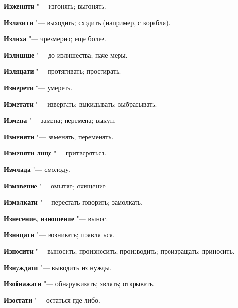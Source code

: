 \begin{mymulticols}{2}
\noindent\textbf{Изженяти} "--- изгонять; выгонять. 




\noindent\textbf{Излазити} "--- выходить; сходить (например, с корабля). 




\noindent\textbf{Излиха} "--- чрезмерно; еще более. 




\noindent\textbf{Излишше} "--- до излишества; паче меры. 




\noindent\textbf{Изляцати} "--- протягивать; простирать. 




\noindent\textbf{Измерети} "--- умереть. 




\noindent\textbf{Изметати} "--- извергать; выкидывать; выбрасывать. 




\noindent\textbf{Измена} "--- замена; перемена; выкуп. 




\noindent\textbf{Изменяти} "--- заменять; переменять. 




\noindent\textbf{Изменяти лице} "--- притворяться. 




\noindent\textbf{Измлада} "--- смолоду. 




\noindent\textbf{Измовение} "--- омытие; очищение. 




\noindent\textbf{Измолкати} "--- перестать говорить; замолкать. 




\noindent\textbf{Изнесение, изношение} "--- вынос. 




\noindent\textbf{Изницати} "--- возникать; появляться. 




\noindent\textbf{Износити} "--- выносить; произносить; производить; произращать; приносить. 




\noindent\textbf{Изнуждати} "--- выводить из нужды. 




\noindent\textbf{Изобнажати} "--- обнаруживать; являть; открывать. 




\noindent\textbf{Изостати} "--- остаться где-либо. 





\end{mymulticols}
